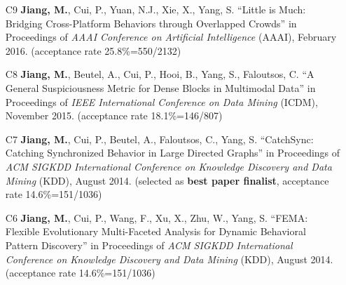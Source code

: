 \documentclass[10pt]{article}
\newenvironment{myindentpar}[1]%
{\begin{list}{}%
         {\setlength{\leftmargin}{#1}}%
         \item[]%
}
{\end{list}}
\newcounter{list}
\newcommand{\hide}[1]{}
\begin{document}
\begin{myindentpar}{0.00cm}
\begin{enumerate}[leftmargin=.5cm]
	\hide{\vspace{-0.1cm}\hspace{0.5cm}{\small \emph{I conceived the idea, designed the study, did the experiments, and wrote the paper.}}}

\item[C9] \textbf{Jiang, M.}, Cui, P., Yuan, N.J., Xie, X., Yang, S. ``Little is Much: Bridging Cross-Platform Behaviors through Overlapped Crowds'' in Proceedings of \emph{AAAI Conference on Artificial Intelligence} (AAAI), February 2016. (acceptance rate 25.8\%=550/2132)

	\hide{\vspace{-0.1cm}\hspace{0.5cm}{\small \emph{I conceived the idea in consultation with Dr. Cui. I designed the study, completed the experiments, and wrote the paper.}}}

\item[C8] \textbf{Jiang, M.}, Beutel, A., Cui, P., Hooi, B., Yang, S., Faloutsos, C. ``A General Suspiciousness Metric for Dense Blocks in Multimodal Data'' in Proceedings of \emph{IEEE International Conference on Data Mining} (ICDM), November 2015. (acceptance rate 18.1\%=146/807)

	\hide{\vspace{-0.1cm}\hspace{0.5cm}{\small \emph{I conceived the idea in consultation with Dr. Beutel. I designed the study, completed the experiments, and wrote the paper. Dr. Beutel edited the paper.}}}

\item[C7] \textbf{Jiang, M.}, Cui, P., Beutel, A., Faloutsos, C., Yang, S. ``CatchSync: Catching Synchronized Behavior in Large Directed Graphs'' in Proceedings of \emph{ACM SIGKDD International Conference on Knowledge Discovery and Data Mining} (KDD), August 2014. (selected as \textbf{best paper finalist}, acceptance rate 14.6\%=151/1036)

	\hide{\vspace{-0.1cm}\hspace{0.5cm}{\small \emph{I conceived the idea in consultation with Dr. Faloutsos. I designed the study, did the experiments, and wrote the paper. Drs. Beutel and Faloutsos edited the paper.}}}

\item[C6] \textbf{Jiang, M.}, Cui, P., Wang, F., Xu, X., Zhu, W., Yang, S. ``FEMA: Flexible Evolutionary Multi-Faceted Analysis for Dynamic Behavioral Pattern Discovery'' in Proceedings of \emph{ACM SIGKDD International Conference on Knowledge Discovery and Data Mining} (KDD), August 2014. (acceptance rate 14.6\%=151/1036)


\end{enumerate}
\end{myindentpar}
\end{document}
